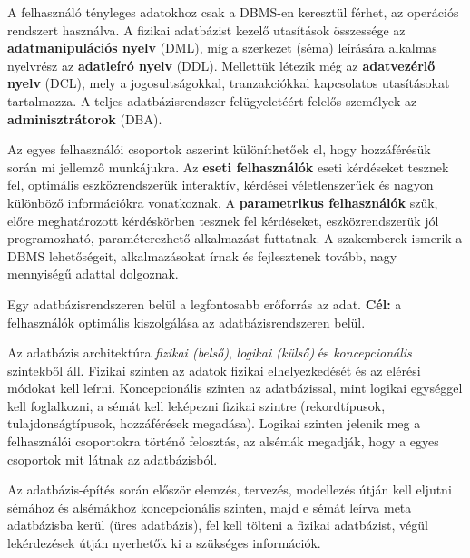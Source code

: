A felhasználó tényleges adatokhoz csak a DBMS-en keresztül férhet, az operációs rendszert használva. A fizikai adatbázist kezelő utasítások összessége az \textbf{adatmanipulációs nyelv} (DML), míg a szerkezet (séma) leírására alkalmas nyelvrész az \textbf{adatleíró nyelv} (DDL). Mellettük létezik még az \textbf{adatvezérlő nyelv} (DCL), mely a jogosultságokkal, tranzakciókkal kapcsolatos utasításokat tartalmazza. A teljes adatbázisrendszer felügyeletéért felelős személyek az \textbf{adminisztrátorok} (DBA).

Az egyes felhasználói csoportok aszerint különíthetőek el, hogy hozzáférésük során mi jellemző munkájukra. Az \textbf{eseti felhasználók} eseti kérdéseket tesznek fel, optimális eszközrendszerük interaktív, kérdései véletlenszerűek és nagyon különböző információkra vonatkoznak. A \textbf{parametrikus felhasználók} szűk, előre meghatározott kérdéskörben tesznek fel kérdéseket, eszközrendszerük jól programozható, paraméterezhető alkalmazást futtatnak. A szakemberek ismerik a DBMS lehetőségeit, alkalmazásokat írnak és fejlesztenek tovább, nagy mennyiségű adattal dolgoznak.

Egy adatbázisrendszeren belül a legfontosabb erőforrás az adat.
\textbf{Cél:} a felhasználók optimális kiszolgálása az adatbázisrendszeren belül.

Az adatbázis architektúra \emph{fizikai (belső)}, \emph{logikai (külső)} és \emph{koncepcionális} szintekből áll. Fizikai szinten az adatok fizikai elhelyezkedését és az elérési módokat kell leírni. Koncepcionális szinten az adatbázissal, mint logikai egységgel kell foglalkozni, a sémát kell leképezni fizikai szintre (rekordtípusok, tulajdonságtípusok, hozzáférések megadása). Logikai szinten jelenik meg a felhasználói csoportokra történő felosztás, az alsémák megadják, hogy a egyes csoportok mit látnak az adatbázisból.

Az adatbázis-építés során először elemzés, tervezés, modellezés útján kell eljutni sémához és alsémákhoz koncepcionális szinten, majd e sémát leírva meta adatbázisba kerül (üres adatbázis), fel kell tölteni a fizikai adatbázist, végül lekérdezések útján nyerhetők ki a szükséges információk.

